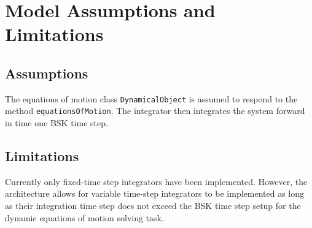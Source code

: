 \section{Model Assumptions and Limitations}

\subsection{Assumptions}

The equations of motion class {\tt DynamicalObject} is assumed to respond to the method  {\tt equationsOfMotion}.  The integrator then integrates the system forward in time one BSK time step.  

\subsection{Limitations}

Currently only fixed-time step integrators have been implemented.  However, the architecture allows for variable time-step integrators to be implemented as long as their integration time step does not exceed the BSK time step setup for the dynamic equations of motion solving task. 
